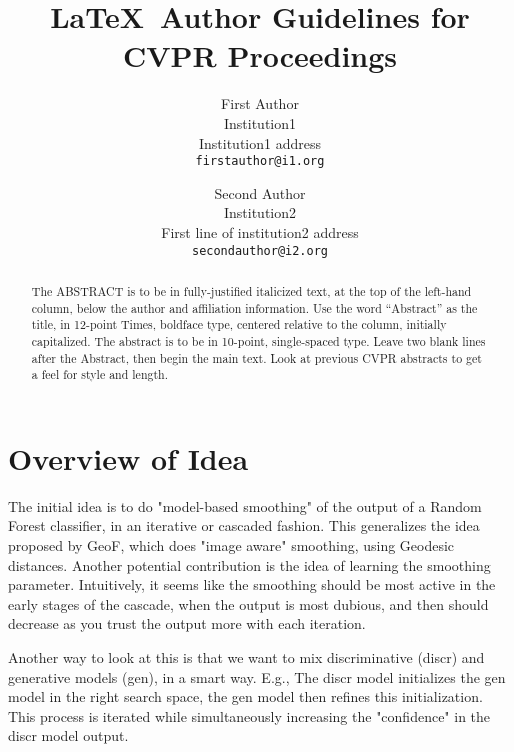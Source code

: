 \documentclass[10pt,twocolumn,letterpaper]{article}
\begin{document}
\title{\LaTeX\ Author Guidelines for CVPR Proceedings}

\author{First Author\\
Institution1\\
Institution1 address\\
{\tt\small firstauthor@i1.org}
\and
Second Author\\
Institution2\\
First line of institution2 address\\
{\tt\small secondauthor@i2.org}
}

\maketitle

\begin{abstract}
   The ABSTRACT is to be in fully-justified italicized text, at the top
   of the left-hand column, below the author and affiliation
   information. Use the word ``Abstract'' as the title, in 12-point
   Times, boldface type, centered relative to the column, initially
   capitalized. The abstract is to be in 10-point, single-spaced type.
   Leave two blank lines after the Abstract, then begin the main text.
   Look at previous CVPR abstracts to get a feel for style and length.
\end{abstract}

\section{Overview of Idea}

The initial idea is to do "model-based smoothing" of the output of a Random Forest classifier, in an iterative or cascaded fashion.  This generalizes the idea proposed by GeoF, which does "image aware" smoothing, using Geodesic distances.  Another potential contribution is the idea of learning the smoothing parameter.  Intuitively, it seems like the smoothing should be most active in the early stages of the cascade, when the output is most dubious, and then should decrease as you trust the output more with each iteration.

Another way to look at this is that we want to mix discriminative (discr) and generative models (gen), in a smart way.  E.g., The discr model initializes the gen model in the right search space, the gen model then refines this initialization.  This process is iterated while simultaneously increasing the "confidence" in the discr model output.
\end{document}
